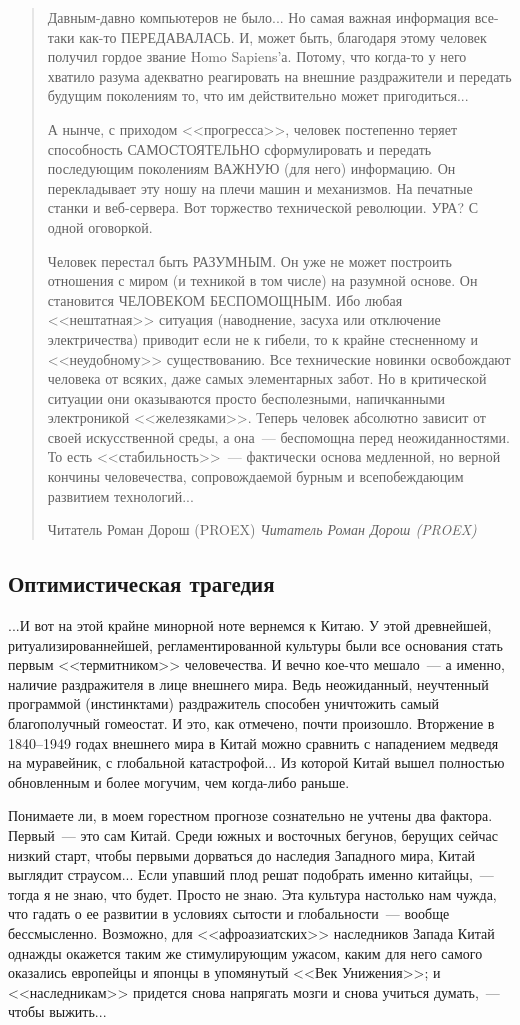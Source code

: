 \documentclass{scrbook}
\makeatletter
\newcommand{\flqq}{<<}
\newcommand{\frqq}{>>}
\newcommand{\mdash}{~--- }
\newcommand{\ndash}{--}
\newcommand{\commamdash}{~--- } %
\newcommand{\essaysection}[1]{\subsection*{#1}\nopagebreak}
\newcommand{\inlineauthor}[1]{\emph{#1}}
\newcommand{\myquotation}[2][\@empty]{
	\begin{quotation}
	#2

	\ifx\@empty#1
	\else
		\nopagebreak	
		\inlineauthor{#1}
	\fi
	\end{quotation}
}
\makeatother
\begin{document}
\myquotation[Читатель Роман Дорош (PROEX)]{Давным-давно компьютеров не было... Но самая важная информация все-таки как-то ПЕРЕДАВАЛАСЬ. И, может быть, благодаря этому человек получил гордое звание Homo Sapiens'а. Потому, что когда-то у него хватило разума адекватно реагировать на внешние раздражители и передать будущим поколениям то, что им действительно может пригодиться...

А нынче, с приходом {\flqq}прогресса{\frqq}, человек постепенно теряет способность САМОСТОЯТЕЛЬНО сформулировать и передать последующим поколениям ВАЖНУЮ (для него) информацию. Он перекладывает эту ношу на плечи машин и механизмов. На печатные станки и веб-сервера. Вот торжество технической революции. УРА? С одной оговоркой.

Человек перестал быть РАЗУМНЫМ. Он уже не может построить отношения с миром (и техникой в том числе) на разумной основе. Он становится ЧЕЛОВЕКОМ БЕСПОМОЩНЫМ. Ибо любая {\flqq}нештатная{\frqq} ситуация (наводнение, засуха или отключение электричества) приводит если не к гибели, то к крайне стесненному и {\flqq}неудобному{\frqq} существованию. Все технические новинки освобождают человека от всяких, даже самых элементарных забот. Но в критической ситуации они оказываются просто бесполезными, напичканными электроникой {\flqq}железяками{\frqq}. Теперь человек абсолютно зависит от своей искусственной среды, а она{\mdash}беспомощна перед неожиданностями. То есть {\flqq}стабильность{\frqq}{\mdash}фактически основа медленной, но верной кончины человечества, сопровождаемой бурным и всепобеждаюцим развитием технологий...}

\essaysection{Оптимистическая трагедия}

...И вот на этой крайне минорной ноте вернемся к Китаю. У этой древнейшей, ритуализированнейшей, регламентированной культуры были все основания стать первым {\flqq}термитником{\frqq} человечества. И вечно кое-что мешало{\mdash}а именно, наличие раздражителя в лице внешнего мира. Ведь неожиданный, неучтенный программой (инстинктами) раздражитель способен уничтожить самый благополучный гомеостат. И это, как отмечено, почти произошло. Вторжение в 1840{\ndash}1949 годах внешнего мира в Китай можно сравнить с нападением медведя на муравейник, с глобальной катастрофой... Из которой Китай вышел полностью обновленным и более могучим, чем когда-либо раньше.

Понимаете ли, в моем горестном прогнозе сознательно не учтены два фактора. Первый{\mdash}это сам Китай. Среди южных и восточных бегунов, берущих сейчас низкий старт, чтобы первыми дорваться до наследия Западного мира, Китай выглядит страусом... Если упавший плод решат подобрать именно китайцы,{\commamdash}тогда я не знаю, что будет. Просто не знаю. Эта культура настолько нам чужда, что гадать о ее развитии в условиях сытости и глобальности{\mdash}вообще бессмысленно. Возможно, для {\flqq}афроазиатских{\frqq} наследников Запада Китай однажды окажется таким же стимулирующим ужасом, каким для него самого оказались европейцы и японцы в упомянутый {\flqq}Век Унижения{\frqq}; и {\flqq}наследникам{\frqq} придется снова напрягать мозги и снова учиться думать,{\commamdash}чтобы выжить...
\end{document}

